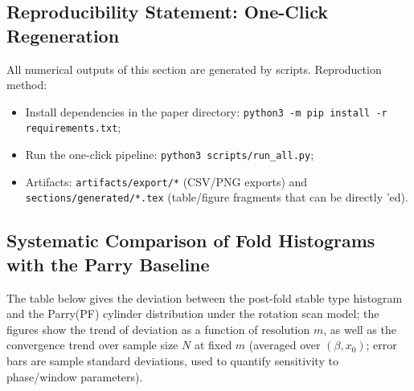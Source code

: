 \subsection{Reproducibility Statement: One-Click Regeneration}

All numerical outputs of this section are generated by scripts. Reproduction method:
\begin{itemize}
  \item Install dependencies in the paper directory: \verb|python3 -m pip install -r requirements.txt|;
  \item Run the one-click pipeline: \verb|python3 scripts/run_all.py|;
  \item Artifacts: \verb|artifacts/export/*| (CSV/PNG exports) and \verb|sections/generated/*.tex| (table/figure fragments that can be directly \verb||'ed).
\end{itemize}

\subsection{Systematic Comparison of Fold Histograms with the Parry Baseline}

The table below gives the deviation between the post-fold stable type histogram and the Parry(PF) cylinder distribution under the rotation scan model; the figures show the trend of deviation as a function of resolution $m$, as well as the convergence trend over sample size $N$ at fixed $m$ (averaged over $(\beta,x_0)$; error bars are sample standard deviations, used to quantify sensitivity to phase/window parameters).







